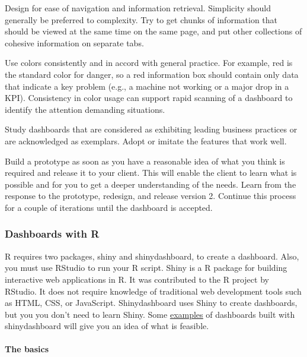 \documentclass[
]{article}
\begin{document}
Design for ease of navigation and information retrieval. Simplicity
should generally be preferred to complexity. Try to get chunks of
information that should be viewed at the same time on the same page, and
put other collections of cohesive information on separate tabs.

Use colors consistently and in accord with general practice. For
example, red is the standard color for danger, so a red information box
should contain only data that indicate a key problem (e.g., a machine
not working or a major drop in a KPI). Consistency in color usage can
support rapid scanning of a dashboard to identify the attention
demanding situations.

Study dashboards that are considered as exhibiting leading business
practices or are acknowledged as exemplars. Adopt or imitate the
features that work well.

Build a prototype as soon as you have a reasonable idea of what you
think is required and release it to your client. This will enable the
client to learn what is possible and for you to get a deeper
understanding of the needs. Learn from the response to the prototype,
redesign, and release version 2. Continue this process for a couple of
iterations until the dashboard is accepted.

\hypertarget{dashboards-with-r}{%
\subsubsection*{Dashboards with R}\label{dashboards-with-r}}

R requires two packages, shiny and shinydashboard, to create a
dashboard. Also, you must use RStudio to run your R script. Shiny is a R
package for building interactive web applications in R. It was
contributed to the R project by RStudio. It does not require knowledge
of traditional web development tools such as HTML, CSS, or JavaScript.
Shinydashboard uses Shiny to create dashboards, but you you don't need
to learn Shiny. Some \href{http://www.apple.com}{\underline{examples}} of
dashboards built with shinydashboard will give you an idea of what is
feasible.

\hypertarget{the-basics}{%
\paragraph*{The basics}\label{the-basics}}
\end{document}
